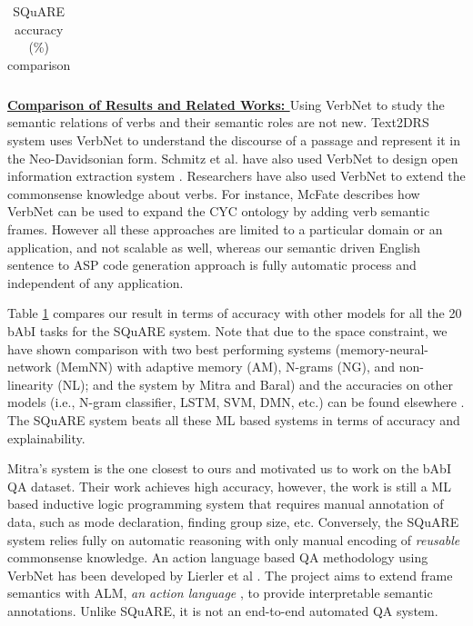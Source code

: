 \documentclass[letterpaper]{article}
\begin{document}
\begin{table}[b]
\begin{tabular}{|c||*{3}{c|}}
\end{tabular}

\vspace{-2.93mm}
\vspace{-2.93mm}
\caption{SQuARE accuracy (\%)  comparison}
\label{table:square_compare}
\end{table}



\noindent\textbf{\underline{Comparison of Results and Related Works: }}
Using VerbNet to study the semantic relations of verbs and their semantic roles are not new. Text2DRS system \cite{text_to_drs} uses VerbNet to understand the discourse of a passage and represent it in the Neo-Davidsonian form. Schmitz et al. have also used VerbNet to design open information extraction system \cite{vn_ie}. Researchers have also used VerbNet to extend the commonsense knowledge about verbs. For instance, McFate \cite{cyc_vn} describes how VerbNet can be used to expand the CYC ontology by adding verb semantic frames. However all these approaches are limited to a particular domain or an application, and not scalable as well, whereas our semantic driven English sentence to ASP code generation approach is fully automatic process and independent of any application.

Table \ref{table:square_compare} compares our result in terms of accuracy with other models for all the 20 bAbI tasks for the SQuARE system. Note that due to the space constraint, we have shown comparison with two best performing systems (memory-neural-network (MemNN) with adaptive memory (AM), N-grams (NG), and non-linearity (NL); and the system by Mitra and Baral) and the accuracies on other models (i.e., N-gram classifier, LSTM, SVM, DMN, etc.) can be found elsewhere \cite{babi,dmn}. The SQuARE system beats all these ML based systems in terms of accuracy and explainability.

Mitra's system is the one closest to ours and motivated us to work on
the bAbI QA dataset. Their work achieves high accuracy, however, the
work is still a ML based inductive logic programming system that
requires manual annotation of data, such as mode declaration, finding
group size, etc. Conversely, the SQuARE system relies fully on
automatic reasoning with only manual encoding of \textit{reusable}
commonsense knowledge. An action language based QA methodology using
VerbNet has been developed by Lierler et al \cite{ALM}. The project
aims to extend frame semantics with ALM, \textit{an action language}
\cite{ALM}, to provide interpretable semantic annotations. Unlike
SQuARE, it is not an end-to-end automated QA system.
\end{document}
